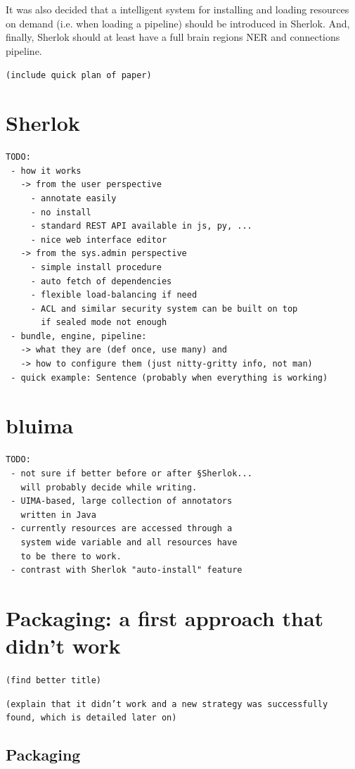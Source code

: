 \documentclass{article}
\newcommand{\TODO}[1]{\texttt{\textcolor{YellowOrange}{(#1)}}} %
\begin{document}
It was also decided that a intelligent system for installing and loading resources on demand (i.e. when loading a pipeline) should be introduced in Sherlok. And, finally, Sherlok should at least have a full brain regions NER and connections pipeline.

\TODO{include quick plan of paper}

\section{Sherlok}

\begin{verbatim}
TODO:
 - how it works
   -> from the user perspective
     - annotate easily
     - no install
     - standard REST API available in js, py, ...
     - nice web interface editor
   -> from the sys.admin perspective
     - simple install procedure
     - auto fetch of dependencies
     - flexible load-balancing if need
     - ACL and similar security system can be built on top
       if sealed mode not enough
 - bundle, engine, pipeline:
   -> what they are (def once, use many) and
   -> how to configure them (just nitty-gritty info, not man)
 - quick example: Sentence (probably when everything is working)
\end{verbatim}



\section{bluima}

\begin{verbatim}
TODO:
 - not sure if better before or after §Sherlok...
   will probably decide while writing.
 - UIMA-based, large collection of annotators
   written in Java
 - currently resources are accessed through a
   system wide variable and all resources have
   to be there to work.
 - contrast with Sherlok "auto-install" feature
\end{verbatim}

\section{Packaging: a first approach that didn't work}

\TODO{find better title}

\TODO{explain that it didn't work and a new strategy was successfully found, which is detailed later on}

\subsection{Packaging}
\end{document}
